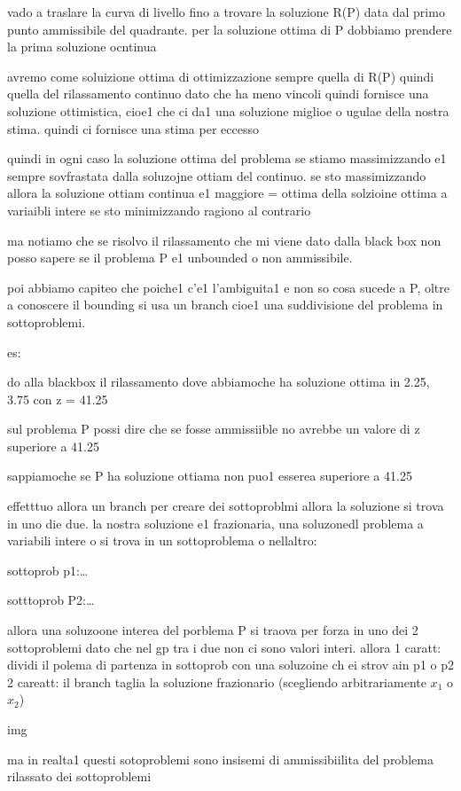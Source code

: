 vado a traslare la curva di livello fino a trovare la soluzione R(P) data dal primo punto ammissibile del quadrante. per la soluzione ottima di P dobbiamo prendere la prima soluzione ocntinua


avremo come soluizione ottima di ottimizzazione sempre quella di R(P) quindi quella del rilassamento continuo dato che ha meno vincoli quindi fornisce una soluzione ottimistica, cioe1 che ci da1 una soluzione miglioe o ugulae della nostra stima. quindi ci fornisce una stima per eccesso


quindi in ogni caso la soluzione ottima del problema se stiamo massimizzando e1 sempre sovfrastata dalla soluzojne ottiam del continuo. se sto massimizzando allora la soluzione ottiam continua e1 maggiore = ottima della solzioine ottima a variaibli intere se sto minimizzando ragiono al contrario



ma notiamo che se risolvo il rilassamento che mi viene dato dalla black box non posso sapere se il problema P e1 unbounded o non ammissibile.

poi abbiamo capiteo che poiche1 c'e1 l'ambiguita1 e non so cosa sucede a P, oltre a conoscere il bounding si usa un branch cioe1 una suddivisione del problema in sottoproblemi. 

es: 

do alla blackbox il rilassamento dove abbiamoche ha soluzione ottima in 2.25, 3.75 con z = 41.25

sul problema P possi dire che se fosse ammissiible no avrebbe un valore di z superiore a 41.25 

sappiamoche se P ha soluzione ottiama non puo1 esserea superiore a 41.25


effetttuo allora un branch per creare dei sottoproblmi allora la soluzione si trova in uno die due. la nostra soluzione e1 frazionaria, una soluzonedl problema a variabili intere o si trova in un sottoproblema o nellaltro:

sottoprob p1:\dots

sotttoprob P2:\dots


allora una soluzoone interea del porblema P si traova per forza in uno dei 2 sottoproblemi dato che nel gp tra i due non ci sono valori interi. allora
1 caratt: dividi il polema di partenza in sottoprob con una soluzoine ch ei strov ain p1 o p2 
2 careatt: il branch taglia la soluzione frazionario (scegliendo arbitrariamente $x_1$ o $x_2$)

img

ma in realta1 questi sotoproblemi sono insisemi di ammissibiilita del problema rilassato dei sottoproblemi


